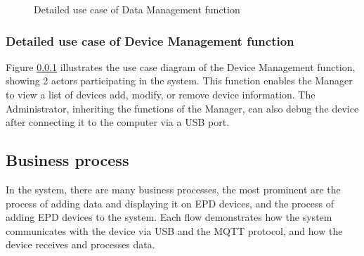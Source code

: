 \documentclass[../Main.tex]{subfiles}
\begin{document}
\begin{figure}[htbp]
    \centering
    \caption{Detailed use case of Data Management function}
    \label{fig:usecasediagram}
\end{figure}

\subsubsection{Detailed use case of Device Management function}
Figure \ref{} illustrates the use case diagram of the Device Management function, showing 2 actors participating in the system. This function enables the Manager to view a list of devices add, modify, or remove device information. The Administrator, inheriting the functions of the Manager, can also debug the device after connecting it to the computer via a USB port. 

\subsection{Business process}
\label{subsection:2.2.3}
In the system, there are many business processes, the most prominent are the process of adding data and displaying it on EPD devices, and the process of adding EPD devices to the system.  Each flow demonstrates how the system communicates with the device via USB and the MQTT protocol, and how the device receives and processes data.
\end{document}
